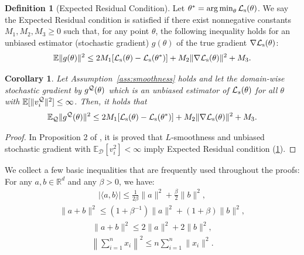 \documentclass{article}
\theoremstyle{plain}
\newtheorem{corollary}[theorem]{Corollary}
\theoremstyle{definition}
\newtheorem{definition}[theorem]{Definition}
\theoremstyle{remark}
\begin{document}
\begin{definition}[Expected Residual Condition]\label{ass:ER}
    Let \(\theta^*=\operatorname*{arg\,min}_{\theta}{\mathcal{L}}_{\text{s}}(\theta)\). We say the Expected Residual condition is satisfied if there exist nonnegative constants \(M_1, M_2, M_3\geq0\) such that, for any point \(\theta\), the following inequality holds for an unbiased estimator (stochastic gradient) \(g(\theta)\) of the true gradient \(\nabla {\mathcal{L}}_{\text{s}}(\theta)\):
    \begin{align*}
        \mathbb{E}\lVert g(\theta)\rVert^2 \leq 2M_1[{\mathcal{L}}_{\text{s}}(\theta)-{\mathcal{L}}_{\text{s}}(\theta^*)]+M_2\lVert\nabla {\mathcal{L}}_{\text{s}}(\theta)\rVert^2+M_3.
    \end{align*}
\end{definition}

\begin{corollary}\label{cor:ER}
    Let Assumption~\ref{ass:smoothness} holds and let the domain-wise stochastic gradient by $g^{\mathcal{Q}}(\theta)$ which is an unbiased estimator of ${\mathcal{L}}_s(\theta)$ for all \(\theta\) with \( \mathbb{E}[\|v^{\mathcal{Q}}_i\|^2] \leq\infty\). Then, it holds that 
    \begin{align*}
        \mathbb{E}_{{\mathcal{Q}}}\lVert g^{\mathcal{Q}}(\theta)\rVert^2 \leq 2M_1[{\mathcal{L}}_{\text{s}}(\theta)-{\mathcal{L}}_{\text{s}}(\theta^*)]+M_2\lVert\nabla {\mathcal{L}}_{\text{s}}(\theta)\rVert^2+M_3.
    \end{align*}
\end{corollary}
\begin{proof}
In Proposition 2 of \citep{khaled2020better_sgd}, it is proved that \(L\)-smoothness and unbiased stochastic gradient with \(\mathbb{E}_{\mathcal{D}}[v_i^2]<\infty\) imply Expected Residual condition (\ref{ass:ER}). 
\end{proof}


We collect a few basic inequalities that are frequently used throughout the proofs: For any \( a, b \in \mathbb{R}^d \) and any \( \beta > 0 \), we have:
\begin{align}
    |\langle a, b \rangle| \leq \frac{1}{2\beta} \lVert a \rVert^2 + \frac{\beta}{2} \lVert b \rVert^2,
    \label{Eq:young_ineq_1}
\end{align}
\begin{align}
    \lVert a + b \rVert^2 \leq (1 + \beta^{-1}) \lVert a \rVert^2 + (1 + \beta) \lVert b \rVert^2,
    \label{Eq:young_ineq_2}
\end{align}
\begin{align}
    \lVert a + b \rVert^2 \leq 2 \lVert a \rVert^2 + 2 \lVert b \rVert^2,
    \label{Eq:young_ineq_3}
\end{align}
\begin{align}
    \left\lVert \sum_{i=1}^n x_i \right\rVert^2 \leq n \sum_{i=1}^n \lVert x_i \rVert^2.
    \label{Eq:young_ineq_4}
\end{align}
\end{document}

